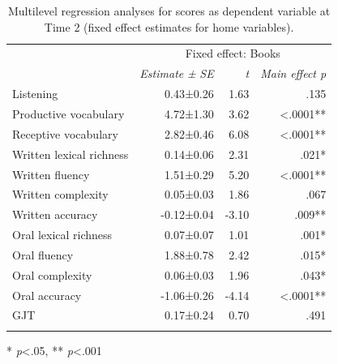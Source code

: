 \documentclass[output=paper,modfonts,nonflat,newtxmath]{langsci/langscibook}
\begin{document}
\begin{table}
\caption{\label{tab:pfenninger:17} Multilevel regression analyses for scores as dependent variable at Time 2 (fixed effect estimates for home variables).}
\begin{tabularx}{0.85\textwidth}{l rrr}
\lsptoprule
& \multicolumn{3}{c}{ Fixed effect: Books}\\
\cmidrule{2-4}
 & \textit{Estimate} \textit{±} \textit{SE} & \textit{t}  & \textit{Main effect p}\\
\cmidrule{1-4}
Listening & 0.43±0.26 & 1.63 & .135  \\
Productive vocabulary & 4.72±1.30 & 3.62 & <.0001** \\
Receptive vocabulary & 2.82±0.46 & 6.08 & <.0001**  \\
Written lexical richness & 0.14±0.06 & 2.31 & .021* \\
Written fluency & 1.51±0.29 & 5.20 & <.0001**  \\
Written complexity & 0.05±0.03 & 1.86 & .067  \\
Written accuracy & -0.12±0.04 & -3.10 & .009**  \\
Oral lexical richness & 0.07±0.07 & 1.01 & .001*\\
Oral fluency & 1.88±0.78 & 2.42 & .015*  \\
Oral complexity & 0.06±0.03 & 1.96 & .043*  \\
Oral accuracy & -1.06±0.26 & -4.14 & <.0001** \\
GJT & 0.17±0.24 & 0.70 & .491  \\
	\lspbottomrule
\end{tabularx}

* \textit{p}<.05, ** \textit{p}<.001
\end{table}
\end{document}

